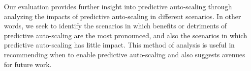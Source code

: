 Our evaluation provides further insight into predictive auto-scaling
through analyzing the impacts of predictive auto-scaling in different scenarios.
In other words, we seek to identify the scenarios in which benefits or
detriments of predictive auto-scaling are the most pronounced, and also the
scenarios in which predictive auto-scaling has little impact. This method of
analysis is useful in recommending when to enable predictive auto-scaling
and also suggests avenues for future work.
